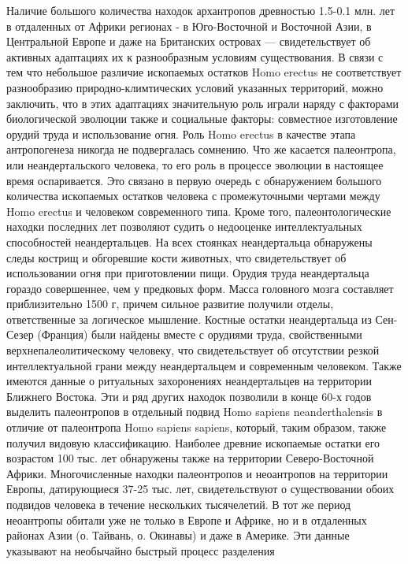 \documentclass[12pt]{article}
\begin{document}
Наличие большого количества находок архантропов древностью 1.5-0.1 млн. лет в отдаленных от Африки
регионах - в Юго-Восточной и Восточной Азии, в Центральной Европе и даже на Британских островах --- свидетельствует об активных адаптациях их к разнообразным условиям существования. В связи с тем что
небольшое  различие  ископаемых  остатков  Homo  erectus  не  соответствует  разнообразию  природно-климтических условий указанных территорий, можно заключить, что в этих адаптациях значительную роль
играли наряду с факторами биологической эволюции также и социальные факторы: совместное изготовление
орудий труда и использование огня.
Роль  Homo  erectus  в  качестве  этапа  антропогенеза  никогда  не  подвергалась  сомнению.  Что  же  касается
палеонтропа, или неандертальского человека, то его роль в процессе эволюции в настоящее время оспаривается.
Это  связано  в  первую  очередь  с  обнаружением  большого  количества  ископаемых  остатков  человека  с
промежуточными  чертами  между  Homo  erectus  и  человеком  современного  типа.  Кроме  того,
палеонтологические находки последних лет позволяют судить о недооценке интеллектуальных способностей
неандертальцев. На всех стоянках неандертальца обнаружены следы кострищ и обгоревшие кости животных,
что свидетельствует об использовании огня при приготовлении пищи. Орудия труда неандертальца гораздо
совершеннее, чем у предковых форм. Масса головного мозга составляет приблизительно 1500 г, причем сильное
развитие получили отделы, ответственные за логическое мышление. Костные остатки неандертальца из Сен-Сезер (Франция) были найдены вместе с орудиями труда, свойственными верхнепалеолитическому человеку,
что  свидетельствует  об  отсутствии  резкой  интеллектуальной  грани  между  неандертальцем  и  современным
человеком.  Также  имеются  данные  о  ритуальных  захоронениях  неандертальцев  на  территории  Ближнего
Востока.
Эти и ряд других находок позволили в конце 60-х годов выделить палеонтропов в отдельный подвид Homo
sapiens neanderthalensis в отличие от палеонтропа Homo sapiens sapiens, который, таким образом, также получил
видовую классификацию. Наиболее древние ископаемые остатки его возрастом 100 тыс. лет обнаружены также
на  территории  Северо-Восточной  Африки.  Многочисленные  находки  палеонтропов  и  неоантропов  на
территории Европы, датирующиеся 37-25 тыс. лет, свидетельствуют о существовании обоих подвидов человека
в течение нескольких тысячелетий.
В тот же период неоантропы обитали уже не только в Европе и Африке, но и в отдаленных районах Азии (о.
Тайвань, о. Окинавы) и даже в Америке. Эти данные указывают на необычайно быстрый процесс разделения
\end{document}

